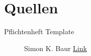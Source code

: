 \section{Quellen}


\begin{description}
	\item[Pflichtenheft Template]
	Simon K. Baur
	\href{http://www.linux-magazin.de/Media/Linux-Magazin/Files/latex}{Link}
\end{description}
